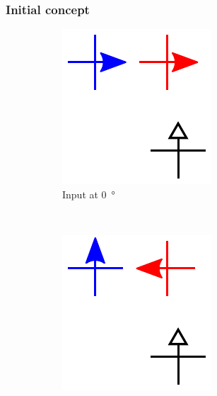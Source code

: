 \documentclass[11pt,a4paper,english]{article}
\newcommand{\rulesep}{\unskip\ \vrule\ }
\begin{document}
\subsubsection{Initial concept}
\begin{figure}
\centering
\begin{subfigure}[t]{0.23\textwidth}
    \includegraphics[width=\textwidth]{Figures/half_adder/schematic/000006_inputs_In1_0213/Input 0 deg.pdf}
    \caption{Input at \SI{0}{\degree}}
\end{subfigure}
\rulesep
\begin{subfigure}[t]{0.23\textwidth}
    \includegraphics[width=\textwidth]{Figures/half_adder/schematic/000006_inputs_In1_0213/Input 90 deg.pdf}

\end{subfigure}
\end{figure}
\end{document}
